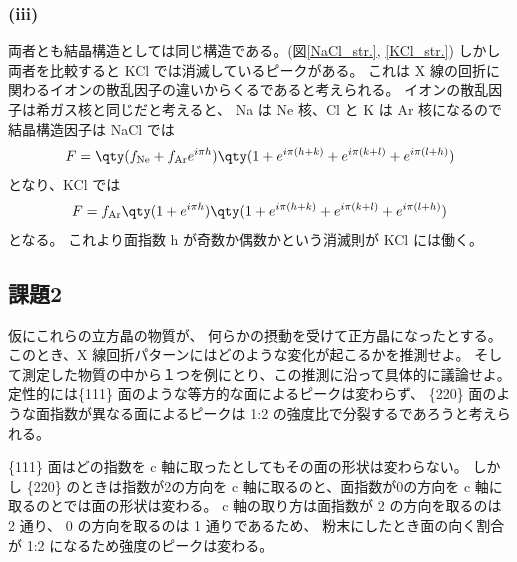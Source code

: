\documentclass[11pt,dvipdfmx,a4paper]{jsarticle}
\begin{document}
\subsubsection*{(iii)}
両者とも結晶構造としては同じ構造である。(図\ref{NaCl_str.}, \ref{KCl_str.})
しかし両者を比較すると KCl では消滅しているピークがある。
これは X 線の回折に関わるイオンの散乱因子の違いからくるであると考えられる。
イオンの散乱因子は希ガス核と同じだと考えると、
Na は Ne 核、Cl と K は Ar 核になるので結晶構造因子は
NaCl では
\begin{align}
	F = \qty(f_{\text{Ne}}+f_{\text{Ar}}e^{i\pi h})\qty(1+e^{i\pi(h+k)}+e^{i\pi(k+l)}+e^{i\pi(l+h)})
\end{align}
となり、KCl では
\begin{align}
	F = f_{\text{Ar}}\qty(1 + e^{i\pi h})\qty(1+e^{i\pi(h+k)}+e^{i\pi(k+l)}+e^{i\pi(l+h)})
\end{align}
となる。
これより面指数 h が奇数か偶数かという消滅則が KCl には働く。

\subsection*{課題2} 仮にこれらの立方晶の物質が、
何らかの摂動を受けて正方晶になったとする。
このとき、X 線回折パターンにはどのような変化が起こるかを推測せよ。
そして測定した物質の中から１つを例にとり、この推測に沿って具体的に議論せよ。\\

定性的には\{111\} 面のような等方的な面によるピークは変わらず、
\{220\} 面のような面指数が異なる面によるピークは 1:2 の強度比で分裂するであろうと考えられる。

\{111\} 面はどの指数を c 軸に取ったとしてもその面の形状は変わらない。%
しかし \{220\} のときは指数が2の方向を c 軸に取るのと、面指数が0の方向を c 軸に取るのとでは面の形状は変わる。
c 軸の取り方は面指数が 2 の方向を取るのは 2 通り、 0 の方向を取るのは 1 通りであるため、
粉末にしたとき面の向く割合が 1:2 になるため強度のピークは変わる。
\end{document}
